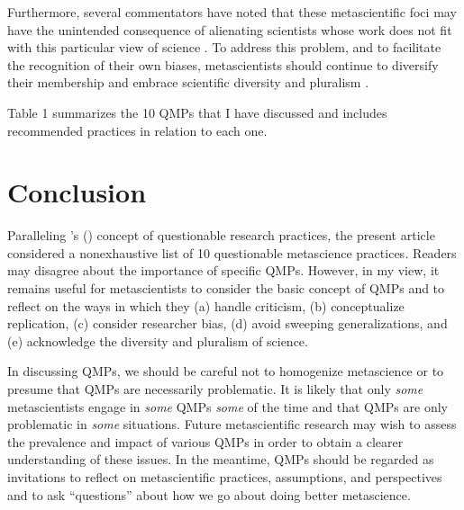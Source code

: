\documentclass[authordate, meta]{jote-new-article}
\begin{document}
Furthermore, several commentators have noted that these metascientific foci may have the unintended consequence of alienating scientists whose work does not fit with this particular view of science \parencites{Bennett2021}{Kessler2021}{Levin2017}{Malich2022}[p. 58]{McDermott2022}{Penders2022}[p. 530]{Pownall2021}{Prosser2022}[p. 170]{Wentzel2021}. To address this problem, and to facilitate the recognition of their own biases, metascientists should continue to diversify their membership and embrace scientific diversity and pluralism \parencites{Andreoletti2020}{Flis2022}{Gervais2021}{Grossmann2021}{Leonelli2022}{Pownall2022}.



Table 1 summarizes the 10 QMPs that I have discussed and includes recommended practices in relation to each one.




\section{Conclusion}



Paralleling \citeauthor{John2012}'s \mbox{(\hspace*{-.21em}\citeyear{John2012})} concept of questionable research practices, the present article considered a nonexhaustive list of 10 questionable metascience practices\emph{.} Readers may disagree about the importance of specific QMPs. However, in my view, it remains useful for metascientists to consider the basic concept of QMPs and to reflect on the ways in which they (a) handle criticism, (b) conceptualize replication, (c) consider researcher bias, (d) avoid sweeping generalizations, and (e) acknowledge the diversity and pluralism of science.



In discussing QMPs, we should be careful not to homogenize metascience \parencites{Field2022} or to presume that QMPs are necessarily problematic. It is likely that only \emph{some} metascientists engage in \emph{some} QMPs \emph{some} of the time and that QMPs are only problematic in \emph{some} situations. Future metascientific research may wish to assess the prevalence and impact of various QMPs in order to obtain a clearer understanding of these issues. In the meantime, QMPs should be regarded as invitations to reflect on metascientific practices, assumptions, and perspectives and to ask “questions” about how we go about doing better metascience.



\nocite{*}

\printbibliography
\end{document}
